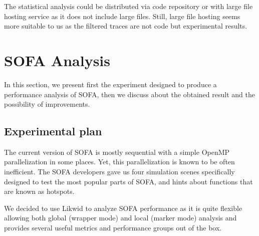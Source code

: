The statistical analysis could be distributed via code repository or with large file hosting service as it does not include large files.
Still, large file hosting seems more suitable to us as the filtered traces are not code but experimental results.

\section{SOFA Analysis}
\label{sec:sofa-analysis}

In this section, we present first the experiment designed to produce a performance analysis of \gls{SOFA}, then we discuss about the obtained result and the possibility of improvements.

\subsection{Experimental plan}

The current version of \gls{SOFA} is mostly sequential with a simple \gls{OpenMP} parallelization in some places.
Yet, this parallelization is known to be often inefficient.
The \gls{SOFA} developers gave us four simulation scenes specifically designed to test the most popular parts of \gls{SOFA}, and hints about functions that are known as hotspots.

We decided to use \gls{Likwid} to analyze \gls{SOFA} performance as it is quite flexible allowing both global (wrapper mode) and local (marker mode) analysis and provides several useful metrics and performance groups out of the box.

